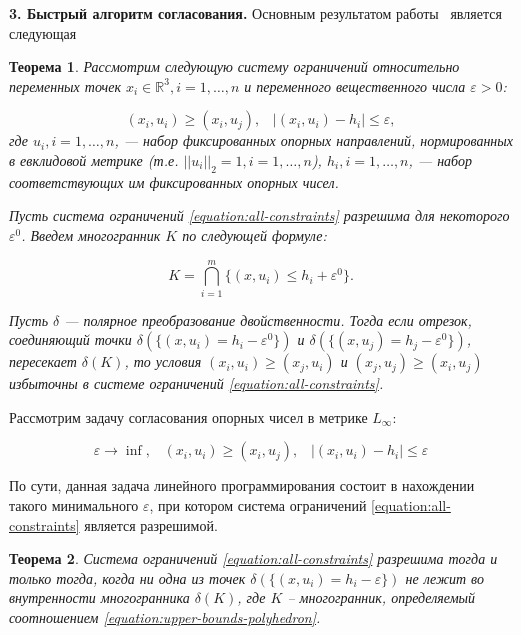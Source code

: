 \documentclass[a4paper, 11pt]{article}
\theoremstyle{MyDefinitionStyle}
\theoremstyle{MyTheoremStyle}
\newtheorem{SmartTheorem}{Теорема}
\begin{document}
\textbf{3. Быстрый алгоритм согласования.}
Основным результатом работы~\cite{palachev} является следующая
\begin{SmartTheorem}\label{theorem:exhaustive-conditions}
Рассмотрим следующую систему ограничений относительно переменных точек
$x_i \in \mathbb{R}^{3}, i = 1, \ldots, n$ и переменного вещественного числа
$\varepsilon > 0$:

\begin{equation}
\label{equation:all-constraints}
 (x_{i}, u_{i}) \geq (x_{i}, u_{j}), \;\;\;
 |(x_{i}, u_{i}) - h_{i}| \leq \varepsilon,
\end{equation}
где $u_i, i = 1, \ldots, n$, --- набор фиксированных опорных направлений,
нормированных в евклидовой метрике (т.е. $||u_i||_{2} = 1, i = 1, \ldots, n$),
$h_i, i = 1 , \ldots, n$, --- набор соответствующих им фиксированных опорных
чисел.

Пусть система ограничений \eqref{equation:all-constraints} разрешима
для некоторого $\varepsilon^{0}$. Введем многогранник $K$ по следующей формуле:

\begin{equation}
\label{equation:upper-bounds-polyhedron}
 K = \bigcap \limits_{i = 1}^{m}\{(x, u_{i}) \leq h_{i} + \varepsilon^{0}\}.
\end{equation}

Пусть $\delta$ --- полярное преобразование двойственности.
Тогда если отрезок, соединяющий точки
$\delta(\{(x, u_{i}) = h_{i} - \varepsilon^{0}\})$ и
$\delta(\{(x, u_{j}) = h_{j} - \varepsilon^{0}\})$, пересекает
$\delta(K)$, то условия $(x_{i}, u_{i}) \geq (x_{j}, u_{i})$ и
$(x_{j}, u_{j}) \geq (x_{i}, u_{j})$ избыточны в системе ограничений
\eqref{equation:all-constraints}.
\end{SmartTheorem}

Рассмотрим задачу согласования опорных чисел в метрике $L_{\infty}$:

\begin{equation}
\label{equation:infinity-problem}
 \varepsilon \to \inf, \;\;\; (x_{i}, u_{i}) \geq (x_{i}, u_{j}), \;\;\;
 |(x_{i}, u_{i}) - h_{i}| \leq \varepsilon
\end{equation}

По сути, данная задача линейного программирования состоит в нахождении такого
минимального $\varepsilon$, при котором система ограничений
\eqref{equation:all-constraints} является разрешимой.

\begin{SmartTheorem}
 Система ограничений \eqref{equation:all-constraints} разрешима тогда и только
 тогда, когда ни одна из точек
 $\delta(\{(x, u_{i}) = h_{i} - \varepsilon\})$ не лежит во внутренности
 многогранника $\delta(K)$, где $K$ -- многогранник, определяемый соотношением
 \eqref{equation:upper-bounds-polyhedron}.
\end{SmartTheorem}
\end{document}
